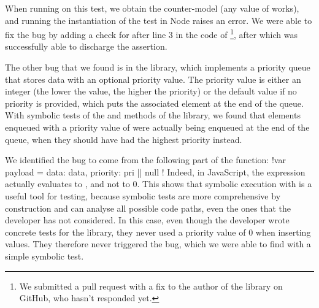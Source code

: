 When running \cosette on this test, we obtain the counter-model  (any value of  works), and running the instantiation of the test in Node raises an error.
We were able to fix the bug by adding a check for  after line 3 in the code of \footnote{We submitted a pull request with a fix to the author of the library on GitHub, who hasn't responded yet.}, after which \cosette was successfully able to discharge the assertion.


The other bug that we found is in the  library, which implements a priority queue that stores data with an optional priority value.
The priority value is either an integer (the lower the value, the higher the priority) or the default  value if no priority is provided, which puts the associated element at the end of the queue.
With symbolic tests of the  and  methods of the library, we found that elements enqueued with a priority value of  were actually being enqueued at the end of the queue, when they should have had the highest priority instead.

We identified the bug to come from the following part of the  function: \jsinline!var payload = { data: data, priority: pri || null }!
Indeed, in JavaScript, the expression  actually evaluates to , and not to 0.
This shows that symbolic execution with \cosette is a useful tool for testing, because symbolic tests are more comprehensive by construction and can analyse all possible code paths, even the ones that the developer has not considered.
In this case, even though the developer wrote concrete tests for the library, they never used a priority value of 0 when inserting values.
They therefore never triggered the bug, which we were able to find with a simple symbolic test.


